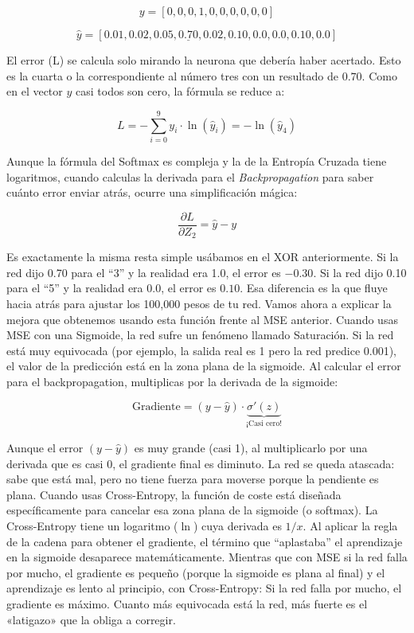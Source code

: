 \documentclass[a4paper,11pt]{article}
\begin{document}
\[
y = [0,0,0,1,0,0,0,0,0,0]
\]

\[
\hat{y}=[0.01, 0.02, 0.05, \underline{0.70}, 0.02, 0.10, 0.0, 0.0, 0.10, 0.0]
\]

El error (L) se calcula solo mirando la neurona que debería haber
acertado. Esto es la cuarta o la correspondiente al número tres con un
resultado de \(0.70\). Como en el vector \(y\) casi todos son cero, la
fórmula se reduce a:

\[
L = -\sum_{i=0}^{9} y_i \cdot \ln(\hat{y}_i) =  -\ln(\hat{y}_4)
\]

Aunque la fórmula del Softmax es compleja y la de la Entropía Cruzada
tiene logaritmos, cuando calculas la derivada para el
\emph{Backpropagation} para saber cuánto error enviar atrás, ocurre una
simplificación mágica:

\[
\frac{\partial L}{\partial Z_2} = \hat{y} - y
\]

Es exactamente la misma resta simple usábamos en el XOR anteriormente.
Si la red dijo 0.70 para el ``3'' y la realidad era 1.0, el error es
\(-0.30\). Si la red dijo 0.10 para el ``5'' y la realidad era 0.0, el
error es \(0.10\). Esa diferencia es la que fluye hacia atrás para
ajustar los 100,000 pesos de tu red. Vamos ahora a explicar la mejora
que obtenemos usando esta función frente al MSE anterior. Cuando usas
MSE con una Sigmoide, la red sufre un fenómeno llamado Saturación. Si la
red está muy equivocada (por ejemplo, la salida real es 1 pero la red
predice 0.001), el valor de la predicción está en la zona plana de la
sigmoide. Al calcular el error para el backpropagation, multiplicas por
la derivada de la sigmoide:

\[\text{Gradiente} = (y - \hat{y}) \cdot \underbrace{\sigma'(z)}_{\text{¡Casi cero!}}\]

Aunque el error \((y - \hat{y})\) es muy grande (casi 1), al
multiplicarlo por una derivada que es casi 0, el gradiente final es
diminuto. La red se queda atascada: sabe que está mal, pero no tiene
fuerza para moverse porque la pendiente es plana. Cuando usas
Cross-Entropy, la función de coste está diseñada específicamente para
cancelar esa zona plana de la sigmoide (o softmax). La Cross-Entropy
tiene un logaritmo (\(\ln\)) cuya derivada es \(1/x\). Al aplicar la
regla de la cadena para obtener el gradiente, el término que
``aplastaba'' el aprendizaje en la sigmoide desaparece matemáticamente.
Mientras que con MSE si la red falla por mucho, el gradiente es pequeño
(porque la sigmoide es plana al final) y el aprendizaje es lento al
principio, con Cross-Entropy: Si la red falla por mucho, el gradiente es
máximo. Cuanto más equivocada está la red, más fuerte es el «latigazo»
que la obliga a corregir.
\end{document}
